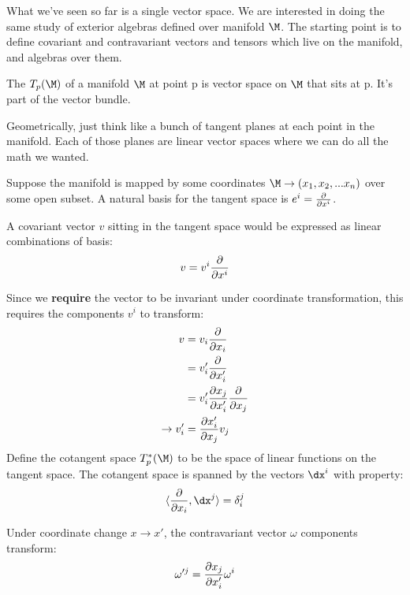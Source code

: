 \documentclass[11pt]{scrartcl}
\begin{document}
What we've seen so far is a single vector space. We are interested in doing the same study of exterior algebras defined over manifold $\M$.
The starting point is to define covariant and contravariant vectors and tensors which live on the manifold, and algebras over them.

\begin{definition}
	The  $T_p( \M)$ of a manifold $\M$ at point p is vector space on $\M$ that sits at p.  It's part of the vector bundle.
\end{definition}

Geometrically, just think like a bunch of tangent planes at each point in the manifold.  Each of those planes are linear vector spaces where we can do all the math we wanted.

Suppose the manifold is mapped by some coordinates $\M \rightarrow (x_1, x_2, ... x_n)$ over some open subset.  A natural basis for the tangent space is $e^i = {\partial \over \partial x^i}$.

A covariant vector $v$ sitting in the tangent space would be expressed as linear combinations of basis:
\begin{align}
	v = v^i {\partial \over \partial x^i}
\end{align}

Since we \textbf{require} the vector to be invariant under coordinate transformation, this requires the components $v^i$ to transform:
\begin{align}
	v &= v_i {\partial \over \partial x_i} \\
	&= v'_i {\partial \over \partial x'_i} \\
	&= v'_i {\partial x_j \over \partial x'_i} {\partial \over \partial x_j} \\
	\rightarrow v'_i &= {\partial x'_i \over \partial x_j} v_j
\end{align}
Define the cotangent space $T_p^*(\M)$ to be the space of linear functions on the tangent space.  The cotangent space is spanned by the  vectors $\dx^i$ with property:
\begin{align}
	\braket{{\partial \over \partial x_i}, \dx^j} = \delta^{j}_i
\end{align}

Under coordinate change $x \rightarrow x'$, the contravariant vector  $\omega$ components transform:
\begin{align}
	\omega'^j = {\partial x_j \over \partial x_i'} \omega^i
\end{align}
\end{document}
